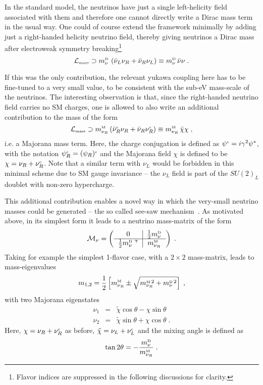 \documentclass[reprint,doublecolumn,secnumarabic,amssymb, amsmath, aps,nofootinbib,superscriptaddress]{revtex4-1}
\newcommand{\be}{\begin{equation}}
\newcommand{\ee}{\end{equation}}
\newcommand{\bea}{\begin{eqnarray}}
\newcommand{\eea}{\end{eqnarray}}
\def\nn{\nonumber}
\begin{document}
In the standard model, the neutrinos have just a single left-helicity field associated with them and therefore one cannot directly write a Dirac mass term in the usual way. One could of course extend the framework minimally by adding just a right-handed helicity neutrino field, thereby giving neutrinos a Dirac mass after electroweak symmetry breaking\footnote{Flavor indices are suppressed in the following discussions for clarity.}
\be
\mathcal{L}_{\text{\tiny{mass}}} \supset   m_\nu^{\text{\tiny{D}}}\,\left( \bar{\nu}_L \nu_R + \bar{\nu}_R \nu_L \right)    \equiv  m_\nu^{\text{\tiny{D}}}\,\bar{\nu} \nu  \; .
\ee

If this was the only contribution, the relevant yukawa coupling here has to be fine-tuned to a very small value, to be consistent with the sub-eV mass-scale of the neutrinos. The interesting observation is that, since the right-handed neutrino field carries no SM charges, one is allowed to also write an additional contribution to the mass of the form 
\be
\mathcal{L}_{\text{\tiny{mass}}} \supset m_{\nu_R}^{\text{\tiny{M}}}  \left(  \bar{\nu}^{\text{\tiny{c}}}_R \nu_R + \bar{\nu}_R \nu_R^{\text{\tiny{c}}} \right) \equiv m_{\nu_R}^{\text{\tiny{M}}} \,\bar{\chi} \chi \; ,
\ee
i.e. a Majorana mass term. Here, the charge conjugation is defined as $\psi^{\text{\tiny{c}}}=i \gamma^2 \psi^*$, with the notation $\psi^{\text{\tiny{c}}}_R=(\psi_R)^{\text{\tiny{c}}}$ and the Majorana field $\chi$ is defined to be $\chi=\nu_R+\nu_R^{\text{\tiny{c}}}$. Note that a similar term with $\nu_L$ would be forbidden in this minimal scheme due to SM gauge invariance -- the $\nu_L$ field is part of the $SU(2)_L$ doublet with non-zero hypercharge.

This additional contribution enables a novel way in which the very-small neutrino masses could be generated -- the so called see-saw mechanism~\cite{see-saw}. As motivated above, in its simplest form it leads to a neutrino mass-matrix of the form
\be
 \mathcal{M}_\nu =  
\left ( 
\begin{tabular}{c|c}
0 &  $ \frac{1}{2} m_\nu^{\text{\tiny{D}}}$\\
\hline
 $ \frac{1}{2} m_\nu^{\text{\tiny{D}}~\text{\tiny{T}}}$ & $m_{\nu_R}^{\text{\tiny{M}}} $ \\
 \end{tabular}
 \right)\;.
\ee
Taking for example the simplest 1-flavor case, with a $2\times2$ mass-matrix, leads to mass-eigenvalues
\bea
m_{1,2}=\frac{1}{2}\left[m_{\nu_R}^{\text{\tiny{M}}} \pm \sqrt{m_{\nu_R}^{\text{\tiny{M}}\,2} + m_\nu^{\text{\tiny{D}}\,2} } \right]\; ,
\eea
with two Majorana eigenstates
\bea
\nu_1 &=& \tilde{\chi} \cos\theta - \chi \sin\theta \\ \nn
\nu_2 &=& \tilde{\chi} \sin\theta + \chi \cos\theta \; .
\eea
Here, $\chi=\nu_R+\nu_R^{\text{\tiny{c}}}$ as before, $\tilde{\chi}=\nu_L+\nu_L^{\text{\tiny{c}}}$ and the mixing angle is defined as
\be
\tan2\theta= - \frac{m_\nu^{\text{\tiny{D}}}}{m_{\nu_R}^{\text{\tiny{M}}}}\; .
\ee
\end{document}
